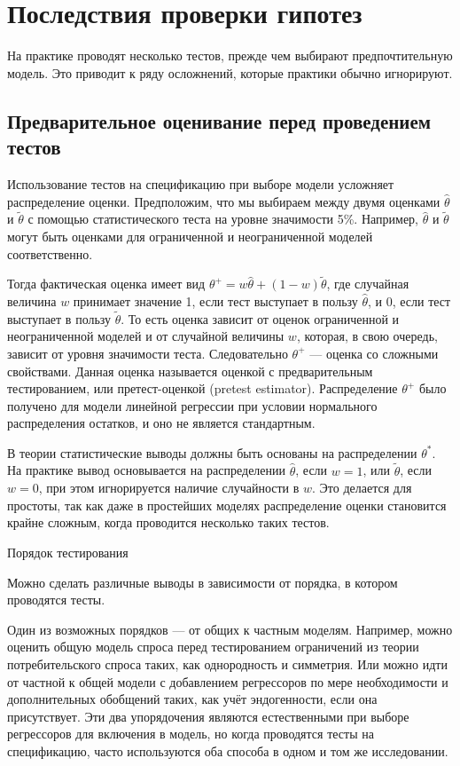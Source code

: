 \section{Последствия проверки гипотез}

На практике проводят несколько тестов, прежде чем выбирают предпочтительную модель. Это приводит к ряду осложнений, которые практики обычно игнорируют.

\subsection{Предварительное оценивание перед проведением тестов}

Использование тестов на спецификацию при выборе модели усложняет распределение оценки. Предположим, что мы выбираем между двумя оценками $\hat{\theta}$ и $\tilde{\theta}$ с помощью статистического теста на уровне значимости 5\%. Например, $\hat{\theta}$ и $\tilde{\theta}$ могут быть оценками для ограниченной и неограниченной моделей соответственно. 

Тогда фактическая оценка имеет вид $\theta^+ = w\hat{\theta} + (1 - w)\tilde{\theta}$, где случайная величина $w$  принимает значение 1, если тест выступает в пользу $\hat{\theta}$, и 0, если тест выступает в пользу $\tilde{\theta}$. То есть оценка зависит от оценок ограниченной и неограниченной моделей и от случайной величины $w$, которая, в свою очередь, зависит от уровня значимости теста. Следовательно $\theta^+$ --- оценка со сложными свойствами. Данная оценка называется оценкой с предварительным тестированием, или претест-оценкой (pretest estimator). Распределение $\theta^+$ было получено для модели линейной регрессии при условии нормального распределения остатков, и оно не является стандартным.

В теории статистические выводы должны быть основаны на распределении $\theta^*$. На практике вывод основывается на распределении $\hat{\theta}$, если $w = 1$, или $\tilde{\theta}$, если $w = 0$, при этом игнорируется наличие случайности в  $w$. Это делается для простоты, так как даже в простейших моделях распределение оценки становится крайне сложным, когда проводится несколько таких тестов.

\begin{center}
Порядок тестирования
\end{center}

Можно сделать различные выводы в зависимости от порядка, в котором проводятся тесты.

Один из возможных порядков ---  от общих к частным моделям. Например, можно оценить общую модель спроса перед тестированием ограничений из теории потребительского спроса таких, как однородность и симметрия. Или  можно идти от частной к общей модели с добавлением регрессоров по мере необходимости и дополнительных обобщений таких, как учёт  эндогенности, если она присутствует. Эти два упорядочения являются естественными при выборе регрессоров для включения в модель, но когда проводятся тесты на спецификацию, часто используются оба способа в одном и том же исследовании.

